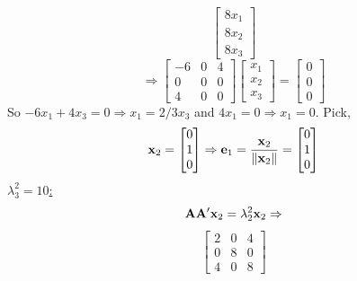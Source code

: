 \begin{enumerate}[font=\bfseries]
\begin{enumerate}
\[\begin{bmatrix}
                    8x_1 \\
                    8x_2 \\
                    8x_3
                \end{bmatrix}
            \]
            \[
                \Rightarrow
                \begin{bmatrix}
                    -6 & 0 & 4 \\
                    0 & 0 & 0 \\
                    4 & 0 & 0
                \end{bmatrix}
                \begin{bmatrix}
                    x_1 \\
                    x_2 \\
                    x_3
                \end{bmatrix}
                =
                \begin{bmatrix}
                    0 \\
                    0 \\
                    0
                \end{bmatrix}
            \]
            So $-6x_1 + 4x_3 = 0 \Rightarrow x_1 = 2/3x_3$ and $4x_1 = 0 \Rightarrow x_1 = 0$. Pick,
            \[
                \bold{x}_2
                =
                \begin{bmatrix}
                    0 \\
                    1 \\
                    0
                \end{bmatrix}
                \Rightarrow
                \bold{e}_1
                =
                \frac{\bold{x}_2}{\left\|\bold{x}_2\right\|}
                =
                \begin{bmatrix}
                    0 \\
                    1 \\
                    0
                \end{bmatrix}
            \]
            \underline{$\lambda_3^2 = 10$:}
            \[
                \bold{A}\bold{A}^\prime\bold{x}_2=\lambda_2^2\bold{x}_2
                \Rightarrow
            \]
            \[
                \begin{bmatrix}
                    2 & 0 & 4 \\
                    0 & 8 & 0 \\
                    4 & 0 & 8
                \end{bmatrix}
\]
\end{enumerate}
\end{enumerate}
